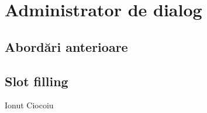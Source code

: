 \chapter{Administrator de dialog}

\section{Abordări anterioare}

\section{Slot filling}

Ionut Ciocoiu